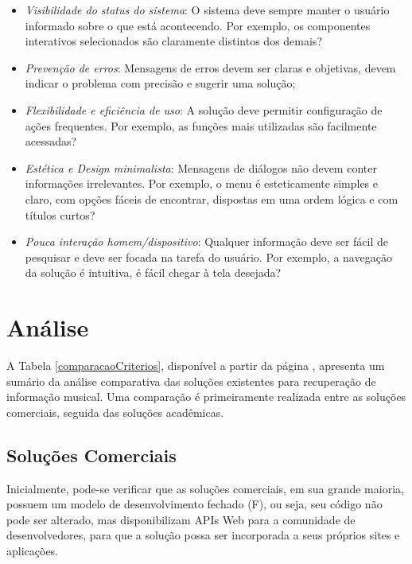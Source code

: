 \begin{itemize}
    \begin{itemize}
        \item \textit{Visibilidade do status do sistema}: O sistema deve sempre manter o usuário informado sobre o que está acontecendo. Por exemplo, os componentes interativos selecionados são claramente distintos dos demais?
        \item \textit{Prevenção de erros}: Mensagens de erros devem ser claras e objetivas, devem indicar o problema com precisão e sugerir uma solução;
        \item \textit{Flexibilidade e eficiência de uso}: A solução deve permitir configuração de ações frequentes. Por exemplo, as funções mais utilizadas são facilmente acessadas?
        \item \textit{Estética e Design minimalista}: Mensagens de diálogos não devem conter informações irrelevantes. Por exemplo, o menu é esteticamente simples e claro, com opções fáceis de encontrar, dispostas em uma ordem lógica e com títulos curtos?
        \item \textit{Pouca interação homem/dispositivo}: Qualquer informação deve ser fácil de pesquisar e deve ser focada na tarefa do usuário. Por exemplo, a navegação da solução é intuitiva, é fácil chegar à tela desejada?
    \end{itemize}
\end{itemize}

\section{Análise} \label{sec:analise}

A Tabela \ref{comparacaoCriterios}, disponível a partir da página \pageref{comparacaoCriterios}, apresenta um sumário da análise comparativa das soluções existentes para recuperação de informação musical. Uma comparação é primeiramente realizada entre as soluções comerciais, seguida das soluções acadêmicas.

\subsection{Soluções Comerciais}

Inicialmente, pode-se verificar que as soluções comerciais, em sua grande maioria, possuem um modelo de desenvolvimento fechado (F), ou seja, seu código não pode ser alterado, mas disponibilizam APIs Web para a comunidade de desenvolvedores, para que a solução possa ser incorporada a seus próprios sites e aplicações.

